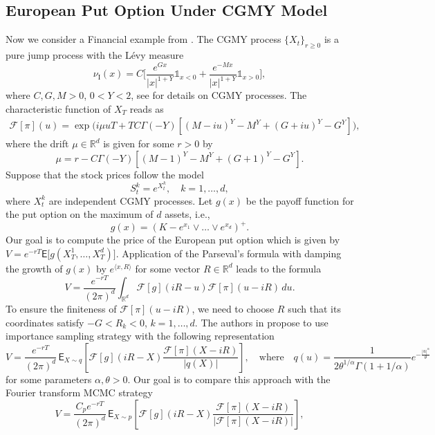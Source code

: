 \documentclass[preprint, 3p, authoryear]{elsarticle}
\newcommand{\E}{\mathsf{E}}
\newcommand{\R}{\mathbb R}
\newcommand{\CGMY}{\text{I}}
\newcommand{\In}{\mathds{1}}
\theoremstyle{definition}
\begin{document}
\subsection{European Put Option Under CGMY Model}
Now we consider a Financial example from  \cite{belomestny16}.
The CGMY process $\{X_t\}_{r\ge0}$ is a pure jump process with the L\'evy measure
\[
	\nu_{\CGMY}(x) = C \biggl[ \frac{e^{Gx}}{|x|^{1+Y}}\In_{x<0}+ \frac{e^{-Mx}}{|x|^{1+Y}}\In_{x>0} \biggl],
\]
where $C,G,M > 0$, $0 < Y < 2$, see \cite{cgmy2002} for details on CGMY processes.
The characteristic function of $X_T$ reads as
\begin{align*}
	\mathcal{F}[\pi](u) = 
	\exp\bigl( {i}\mu u T + TC\Gamma(-Y)
	[(M - iu)^Y - M^Y + (G + iu)^Y - G^Y] \bigr),
\end{align*}
where the drift $\mu\in\R^d$ is given for some $r>0$ by
\[
	\mu = r - C\Gamma(-Y)[(M - 1)^Y - M^Y + (G + 1)^Y - G^Y] .
\]
Suppose that the stock prices follow the model
\[
	S^k_t = e^{X^k_t}, \quad k=1,\ldots,d,
\]
where $X^k_t$ are independent CGMY processes.
Let $g(x)$ be the payoff function for the put option on the maximum of $d$ assets, i.e.,
\[
g(x) = (K  - e^{x_1} \vee\ldots\vee e^{x_d})^{+}.
\]
Our goal is to compute the price of the European put option which is given by
$
	V = e^{-rT} \E\bigl[g(X^1_T,\ldots,X^d_T)\bigr].
$
Application of the Parseval's formula with damping the growth of $g(x)$ by $e^{\langle x,R \rangle}$ for some vector $R\in \mathbb{R}^d$
leads to the formula
\begin{equation*}
V=\frac{e^{-rT}}{(2\pi)^d}\int_{\mathbb{R}^d}\mathcal{F}[g]({i}R-u)\mathcal{F}[\pi](u-{i}R)\, du.
\end{equation*}
To ensure the finiteness of $\mathcal{F}[\pi](u-{i}R)$, we need to choose $R$ such that 
its coordinates satisfy $-G<R_k<0$, $k=1,\ldots,d$.
The authors in \cite{belomestny16} propose to use importance sampling strategy with the following representation 
\[
	V = \frac{e^{-rT}}{(2\pi)^d} \,\mathsf{E}_{X\sim q}\left[\mathcal{F}[g]({i} R-X)\frac{\mathcal{F}[\pi](X-{i}R)}{|q(X)|}\right],
	\quad\text{where}\quad
	q(u) = \frac{1}{2\theta^{1/\alpha}\Gamma(1+1/\alpha)} e^{-\frac{|u|^\alpha}{\theta}}
\]
for some parameters $\alpha, \theta>0$.
Our goal is to compare this approach with the Fourier transform MCMC strategy
\begin{equation*}
	V = \frac{C_p e^{-rT}}{(2\pi)^d} \,\mathsf{E}_{X\sim p}\left[\mathcal{F}[g]({i} R-X)\frac{\mathcal{F}[\pi](X-{i}R)}{|\mathcal{F}[\pi](X-{i}R)|}\right],
\end{equation*}
\end{document}
